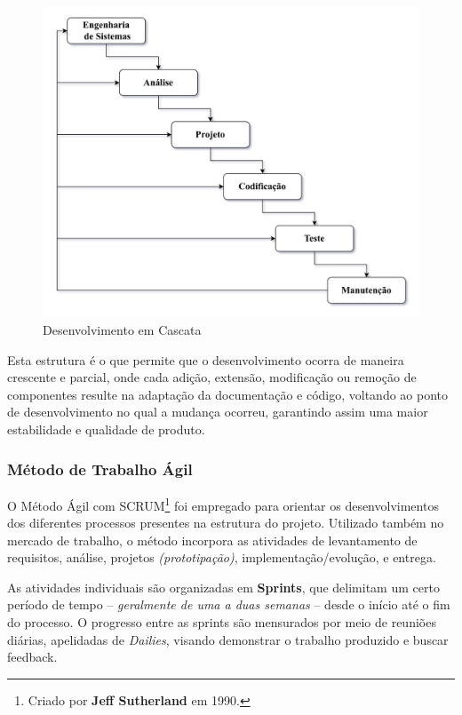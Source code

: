 \documentclass[a4paper,12pt]{article}
\begin{document}
\vspace{1em}
\begin{figure}[H]
    \centering
    \includegraphics[scale=0.25]{waterfall.drawio.png}
    \caption{Desenvolvimento em Cascata}
\end{figure}

Esta estrutura é o que permite que o desenvolvimento ocorra de maneira crescente e parcial, onde cada adição, extensão,
 modificação ou remoção de componentes resulte na adaptação da documentação e código, voltando ao ponto de desenvolvimento 
 no qual a mudança ocorreu, garantindo assim uma maior estabilidade e qualidade de produto.

\subsubsection{Método de Trabalho Ágil}
O Método Ágil com SCRUM\footnote{
    Criado por \textbf{Jeff Sutherland} em 1990.
} foi empregado para orientar os desenvolvimentos dos diferentes processos presentes na estrutura do projeto. Utilizado também no mercado de trabalho, o método incorpora as atividades de levantamento de requisitos, análise, projetos \textit{(prototipação)}, implementação/evolução, e entrega.

As atividades individuais são organizadas em \textbf{Sprints}, que delimitam um certo período de 
tempo -- \textit{geralmente de uma a duas semanas} -- desde o início até o fim do processo. O progresso entre as sprints são mensurados por meio de reuniões diárias, apelidadas de \textit{Dailies}, visando demonstrar o trabalho produzido e buscar feedback.
\end{document}
